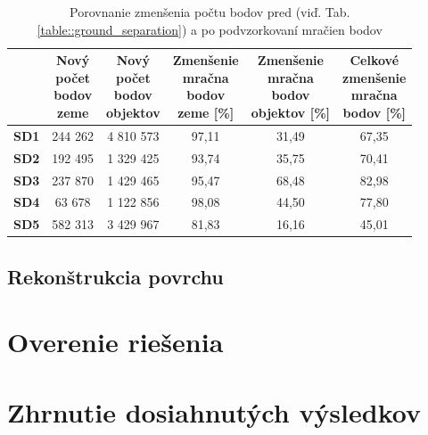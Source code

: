 \begin{table}
    \begin{center} %
        \begin{tabular}{|c || c | c | c | c | c|} 
         \hline
          & \thead{Nový \\ počet \\ bodov \\ zeme} &
            \thead{Nový \\ počet \\ bodov \\ objektov} &
            \thead{Zmenšenie \\ mračna \\ bodov \\ zeme [\%]} &
            \thead{Zmenšenie \\ mračna \\ bodov \\ objektov [\%]} &
            \thead{Celkové \\ zmenšenie \\ mračna \\ bodov [\%]} \\ [0.5ex]    
         \hline\hline
         \textbf{SD1} & 244 262  & 4 810 573 & 97,11 & 31,49 & 67,35 \\ 
         \hline
         \textbf{SD2} & 192 495  & 1 329 425 & 93,74 & 35,75 & 70,41 \\
         \hline
         \textbf{SD3} &  237 870  & 1 429 465 & 95,47 & 68,48 & 82,98 \\
         \hline
         \textbf{SD4} & 63 678  & 1 122 856 & 98,08 & 44,50 & 77,80 \\
         \hline
         \textbf{SD5} & 582 313  & 3 429 967 & 81,83 & 16,16 & 45,01 \\ 
         \hline
        \end{tabular}
    \caption{Porovnanie zmenšenia počtu bodov pred (viď. Tab. \ref{table::ground_separation}) a po podvzorkovaní mračien bodov}
    \end{center}
\end{table}

\subsection{Rekonštrukcia povrchu}

\section{Overenie riešenia}

\section{Zhrnutie dosiahnutých výsledkov}